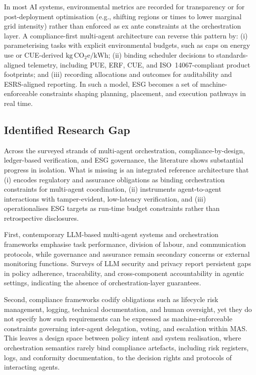 \documentclass[oneside,10pt]{swissi}
\begin{document}
In most AI systems, environmental metrics are recorded for transparency or for post-deployment optimisation (e.g., shifting regions or times to lower marginal grid intensity) rather than enforced as ex ante constraints at the orchestration layer.\cite{dodge2022carbonintensity,henderson2020reporting} A compliance-first multi-agent architecture can reverse this pattern by: (i) parameterising tasks with explicit environmental budgets, such as caps on energy use or CUE-derived \(\mathrm{kg\,CO_2e/kWh}\); (ii) binding scheduler decisions to standards-aligned telemetry, including PUE, ERF, CUE, and ISO~14067-compliant product footprints; and (iii) recording allocations and outcomes for auditability and ESRS-aligned reporting. In such a model, ESG becomes a set of machine-enforceable constraints shaping planning, placement, and execution pathways in real time.\cite{schwartz2020greenai,iso30134_8_2022,esrs_e1_2023}

\subsection{Identified Research Gap}

Across the surveyed strands of multi-agent orchestration, compliance-by-design, ledger-based verification, and ESG governance, the literature shows substantial progress in isolation. What is missing is an integrated reference architecture that (i) encodes regulatory and assurance obligations as binding orchestration constraints for multi-agent coordination, (ii) instruments agent-to-agent interactions with tamper-evident, low-latency verification, and (iii) operationalises ESG targets as run-time budget constraints rather than retrospective disclosures.

First, contemporary LLM-based multi-agent systems and orchestration frameworks emphasise task performance, division of labour, and communication protocols, while governance and assurance remain secondary concerns or external monitoring functions.\cite{li2024llmmas_survey,yao2024llmsecpriv} Surveys of LLM security and privacy report persistent gaps in policy adherence, traceability, and cross-component accountability in agentic settings, indicating the absence of orchestration-layer guarantees.\cite{yao2024llmsecpriv}

Second, compliance frameworks codify obligations such as lifecycle risk management, logging, technical documentation, and human oversight, yet they do not specify how such requirements can be expressed as machine-enforceable constraints governing inter-agent delegation, voting, and escalation within MAS.\cite{eu_ai_act_2024,nist_ai_rmf_2023} This leaves a design space between policy intent and system realisation, where orchestration semantics rarely bind compliance artefacts, including risk registers, logs, and conformity documentation, to the decision rights and protocols of interacting agents.\cite{nist_ai_rmf_2023}
\end{document}
